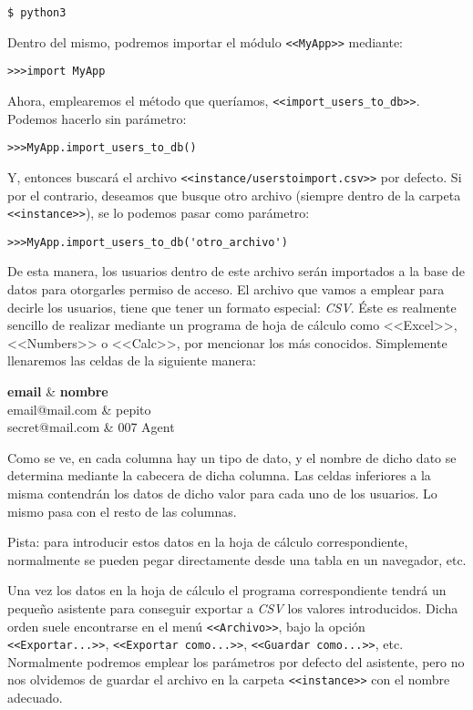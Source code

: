 \noindent\verb|$ python3|

Dentro del mismo, podremos importar el módulo \texttt{<<MyApp>>} mediante:

\noindent\verb|>>>import MyApp|

Ahora, emplearemos el método que queríamos, \texttt{<<import\_users\_to\_db>>}. Podemos hacerlo sin parámetro:

\noindent\verb|>>>MyApp.import_users_to_db()|

Y, entonces buscará el archivo \texttt{<<instance\slash users\textunderscore to\textunderscore import.csv>>} por defecto. Si por el contrario, deseamos que busque otro archivo (siempre dentro de la carpeta \texttt{<<instance>>}), se lo podemos pasar como parámetro:

\noindent\verb|>>>MyApp.import_users_to_db('otro_archivo')|

De esta manera, los usuarios dentro de este archivo serán importados a la base de datos para otorgarles permiso de acceso. El archivo que vamos a emplear para decirle los usuarios, tiene que tener un formato especial: \textit{CSV}. Éste es realmente sencillo de realizar mediante un programa de hoja de cálculo como <<Excel>>, <<Numbers>> o <<Calc>>, por mencionar los más conocidos. Simplemente llenaremos las celdas de la siguiente manera:

{
	\textbf{email} & \textbf{nombre} \\
}
{
	email@mail.com & pepito \\
	secret@mail.com & 007 Agent \\
}

Como se ve, en cada columna hay un tipo de dato, y el nombre de dicho dato se determina mediante la cabecera de dicha columna. Las celdas inferiores a la misma contendrán los datos de dicho valor para cada uno de los usuarios. Lo mismo pasa con el resto de las columnas.

Pista: para introducir estos datos en la hoja de cálculo correspondiente, normalmente se pueden pegar directamente desde una tabla en un navegador, etc.

Una vez los datos en la hoja de cálculo el programa correspondiente tendrá un pequeño asistente para conseguir exportar a \textit{CSV} los valores introducidos. Dicha orden suele encontrarse en el menú \texttt{<<Archivo>>}, bajo la opción \texttt{<<Exportar...>>}, \texttt{<<Exportar como...>>}, \texttt{<<Guardar como...>>}, etc. Normalmente podremos emplear los parámetros por defecto del asistente, pero no nos olvidemos de guardar el archivo en la carpeta \texttt{<<instance>>} con el nombre adecuado.


